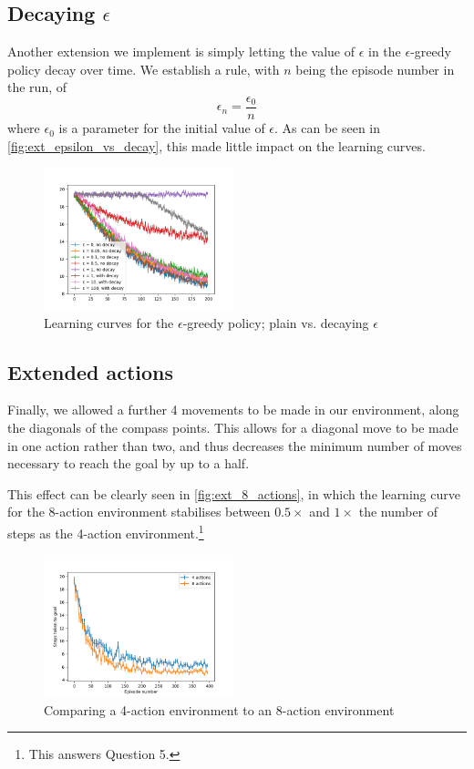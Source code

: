 \documentclass[a4paper, 11pt, twocolumn, final]{article} %
\begin{document}
\subsection{Decaying $\epsilon$} Another extension we implement is simply
letting the value of $\epsilon$ in the $\epsilon$-greedy policy decay over time.
We establish a rule, with $n$ being the episode number in the run, of
\begin{equation}
  \epsilon_n = \frac{\epsilon_0}{n}
\end{equation}
where $\epsilon_0$ is a parameter for the initial value of $\epsilon$.  As can
be seen in \autoref{fig:ext_epsilon_vs_decay}, this made little impact on the
learning curves.

\begin{figure}
  \includegraphics[width=0.49\textwidth]{figures/epsilon_decay.png}
  \caption{Learning curves for the $\epsilon$-greedy policy; plain vs. decaying
  $\epsilon$}
  \label{fig:ext_epsilon_vs_decay}
\end{figure}

\subsection{Extended actions} Finally, we allowed a further 4 movements to be
made in our environment, along the diagonals of the compass points.  This allows
for a diagonal move to be made in one action rather than two, and thus decreases
the minimum number of moves necessary to reach the goal by up to a half.

This effect can be clearly seen in \autoref{fig:ext_8_actions}, in which the
learning curve for the 8-action environment stabilises between $0.5\times$ and
$1\times$ the number of steps as the 4-action environment.\footnote{This answers
Question 5.}

\begin{figure}
  \includegraphics[width=0.49\textwidth]{figures/4_actions_vs_8_actions.png}
  \caption{Comparing a 4-action environment to an 8-action environment}
  \label{fig:ext_8_actions}
\end{figure}
\end{document}
